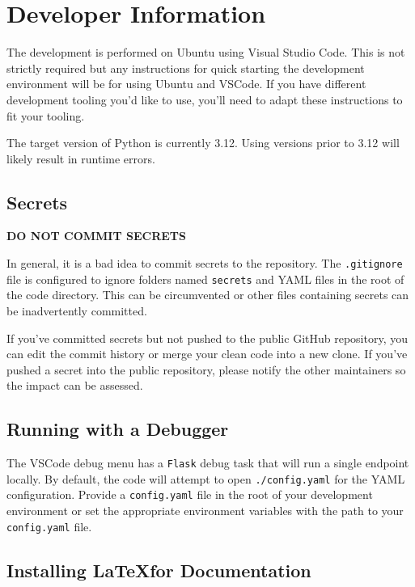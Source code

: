 \chapter{\cxoneflowtext\space Developer Information}

The development is performed on Ubuntu using Visual Studio Code.  This is not 
strictly required but any instructions for quick starting the development environment 
will be for using Ubuntu and VSCode. If you have different development tooling you'd like
to use, you'll need to adapt these instructions to fit your tooling.

The target version of Python is currently 3.12.  Using versions prior to 3.12 will likely result in
runtime errors.

\section{Secrets}

\textbf{DO NOT COMMIT SECRETS}

In general, it is a bad idea to commit secrets to the repository.  The \texttt{.gitignore} file is configured
to ignore folders named \texttt{secrets} and YAML files in the root of the code directory.  This 
can be circumvented or other files containing secrets can be inadvertently committed.

If you've committed secrets but not pushed to the public GitHub repository, you can edit the commit history
or merge your clean code into a new clone.  If you've pushed a secret into the public repository, please notify
the other maintainers so the impact can be assessed.

\section{Running with a Debugger}

The VSCode debug menu has a \texttt{Flask} debug task that will run a single endpoint locally.  By default,
the code will attempt to open \texttt{./config.yaml} for the YAML configuration.  Provide a
\texttt{config.yaml} file in the root of your development environment or set the appropriate environment
variables with the path to your \texttt{config.yaml} file.


\section{Installing \LaTeX\space for Documentation}

